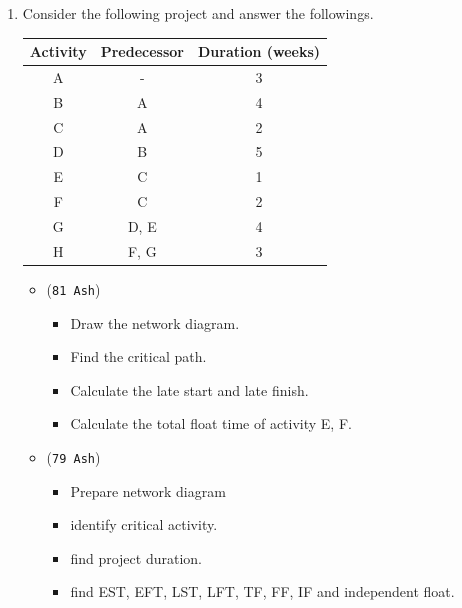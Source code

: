 \documentclass[12pt]{article}
\begin{document}
\begin{enumerate}
      \item Consider the following project and answer the followings. \hfill\\
        \begin{tabular}{|c|c|c|}
          \hline
          Activity & Predecessor & Duration (weeks)\\ \hline
          A & - & 3 \\ \hline
          B & A & 4 \\ \hline
          C & A & 2 \\ \hline
          D & B & 5 \\ \hline
          E & C & 1 \\ \hline
          F & C & 2 \\ \hline
          G & D, E & 4 \\ \hline
          H & F, G & 3 \\ \hline
        \end{tabular}
        \begin{itemize}
          \item [10] (\texttt{81 Ash})
            \begin{itemize}[noitemsep] 
              \item Draw the network diagram.
              \item Find the critical path.
              \item Calculate the late start and late finish.
              \item Calculate the total float time of activity E, F.
            \end{itemize}

          \item [4+2+3+3] (\texttt{79 Ash})
            \begin{itemize}[noitemsep] 
              \item Prepare network diagram
              \item identify critical activity.
              \item find project duration.
              \item find EST, EFT, LST, LFT, TF, FF, IF and independent float.
            \end{itemize}
        \end{itemize}


\end{enumerate}
\end{document}
